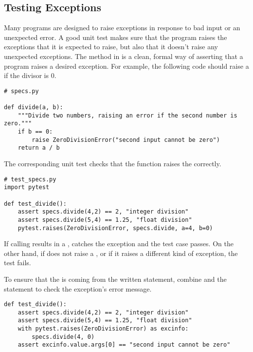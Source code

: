 \subsection*{Testing Exceptions} %

Many programs are designed to raise exceptions in response to bad input or an unexpected error.
A good unit test makes sure that the program raises the exceptions that it is expected to raise, but also that it doesn't raise any unexpected exceptions.
The  method in  is a clean, formal way of asserting that a program raises a desired exception.
For example, the following code should raise a  if the divisor is 0.

\begin{lstlisting}
# specs.py

def divide(a, b):
    """Divide two numbers, raising an error if the second number is zero."""
    if b == 0:
        raise ZeroDivisionError("second input cannot be zero")
    return a / b
\end{lstlisting}

The corresponding unit test checks that the function raises the  correctly.

\begin{lstlisting}
# test_specs.py
import pytest

def test_divide():
    assert specs.divide(4,2) == 2, "integer division"
    assert specs.divide(5,4) == 1.25, "float division"
    pytest.raises(ZeroDivisionError, specs.divide, a=4, b=0)
\end{lstlisting}

If calling  results in a ,  catches the exception and the test case passes.
On the other hand, if  does not raise a , or if it raises a different kind of exception, the test fails.

To ensure that the  is coming from the written  statement, combine  and the  statement to check the exception's error message.

\begin{lstlisting}
def test_divide():
    assert specs.divide(4,2) == 2, "integer division"
    assert specs.divide(5,4) == 1.25, "float division"
    with pytest.raises(ZeroDivisionError) as excinfo:
        specs.divide(4, 0)
    assert excinfo.value.args[0] == "second input cannot be zero"
\end{lstlisting}

